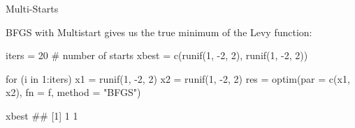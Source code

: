 \documentclass[11pt,compress,t,notes=noshow, xcolor=table]{beamer}
\begin{document}
\begin{vbframe}{Multi-Starts}
\framebreak

BFGS with Multistart gives us the true minimum of the Levy function:\\
\lz

\footnotesize
\begin{verbbox}
iters = 20 # number of starts
xbest = c(runif(1, -2, 2), runif(1, -2, 2))
\end{verbbox}
\theverbbox


\vspace{0.4cm}
\begin{verbbox}
for (i in 1:iters) {
x1 = runif(1, -2, 2)
x2 = runif(1, -2, 2)
res = optim(par = c(x1, x2), fn = f, method = "BFGS")
}
\end{verbbox}
\theverbbox

\vspace{0.4cm}
\theverbbox

\vspace{0.4cm}
\begin{verbbox}
xbest
## [1] 1 1
\end{verbbox}
\theverbbox





\end{vbframe}



\endlecture
\end{document}
